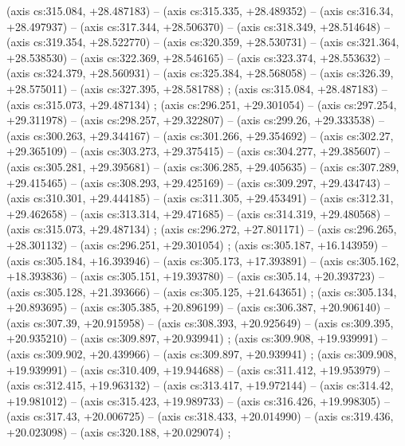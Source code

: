     (axis cs:315.084,    +28.487183) --  (axis cs:315.335,    +28.489352) --  (axis cs:316.34,    +28.497937) --  (axis cs:317.344,    +28.506370) --  (axis cs:318.349,    +28.514648) --  (axis cs:319.354,    +28.522770) --  (axis cs:320.359,    +28.530731) --  (axis cs:321.364,    +28.538530) --  (axis cs:322.369,    +28.546165) --  (axis cs:323.374,    +28.553632) --  (axis cs:324.379,    +28.560931) --  (axis cs:325.384,    +28.568058) --  (axis cs:326.39,    +28.575011) --  (axis cs:327.395,    +28.581788) ;
    (axis cs:315.084,    +28.487183) --  (axis cs:315.073,    +29.487134) ;
    (axis cs:296.251,    +29.301054) --  (axis cs:297.254,    +29.311978) --  (axis cs:298.257,    +29.322807) --  (axis cs:299.26,    +29.333538) --  (axis cs:300.263,    +29.344167) --  (axis cs:301.266,    +29.354692) --  (axis cs:302.27,    +29.365109) --  (axis cs:303.273,    +29.375415) --  (axis cs:304.277,    +29.385607) --  (axis cs:305.281,    +29.395681) --  (axis cs:306.285,    +29.405635) --  (axis cs:307.289,    +29.415465) --  (axis cs:308.293,    +29.425169) --  (axis cs:309.297,    +29.434743) --  (axis cs:310.301,    +29.444185) --  (axis cs:311.305,    +29.453491) --  (axis cs:312.31,    +29.462658) --  (axis cs:313.314,    +29.471685) --  (axis cs:314.319,    +29.480568) --  (axis cs:315.073,    +29.487134) ;
    (axis cs:296.272,    +27.801171) --  (axis cs:296.265,    +28.301132) --  (axis cs:296.251,    +29.301054) ;
    (axis cs:305.187,    +16.143959) --  (axis cs:305.184,    +16.393946) --  (axis cs:305.173,    +17.393891) --  (axis cs:305.162,    +18.393836) --  (axis cs:305.151,    +19.393780) --  (axis cs:305.14,    +20.393723) --  (axis cs:305.128,    +21.393666) --  (axis cs:305.125,    +21.643651) ;
    (axis cs:305.134,    +20.893695) --  (axis cs:305.385,    +20.896199) --  (axis cs:306.387,    +20.906140) --  (axis cs:307.39,    +20.915958) --  (axis cs:308.393,    +20.925649) --  (axis cs:309.395,    +20.935210) --  (axis cs:309.897,    +20.939941) ;
    (axis cs:309.908,    +19.939991) --  (axis cs:309.902,    +20.439966) --  (axis cs:309.897,    +20.939941) ;
    (axis cs:309.908,    +19.939991) --  (axis cs:310.409,    +19.944688) --  (axis cs:311.412,    +19.953979) --  (axis cs:312.415,    +19.963132) --  (axis cs:313.417,    +19.972144) --  (axis cs:314.42,    +19.981012) --  (axis cs:315.423,    +19.989733) --  (axis cs:316.426,    +19.998305) --  (axis cs:317.43,    +20.006725) --  (axis cs:318.433,    +20.014990) --  (axis cs:319.436,    +20.023098) --  (axis cs:320.188,    +20.029074) ;

